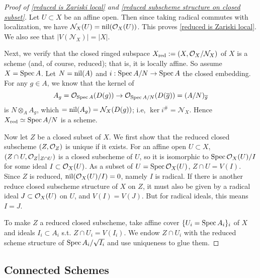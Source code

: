 \begin{proof}[Proof of \cref{reduced is Zariski local} and \cref{reduced subscheme structure on closed subset}]
    Let $U\subset X$ be an affine open.
    Then since taking radical commutes with localization,
    we have $\mathcal{N}_X(U) = \operatorname{nil}(\mathcal{O}_X(U))$.
    This proves \cref{reduced is Zariski local}.
    We also see that $|V(\mathcal{N}_X)| = |X|$.

    Next, we verify that the closed ringed subspace $X_{\operatorname{red}} := (X, \mathcal{O}_X/\mathcal{N}_X)$
    of $X$ is a scheme (and, of course, reduced); that is, it is locally affine. So assume $X = \operatorname{Spec} A$.
    Let $N = \operatorname{nil}(A)$ and $i : \operatorname{Spec} A/N\to \operatorname{Spec} A$ the closed embedding.
    For any $g\in A$,
    we know that the kernel of
    \[A_g = \mathcal{O}_{\operatorname{Spec} A}(D(g))\to \mathcal{O}_{\operatorname{Spec} A/N}(D(\overline g)) = (A/N)_{\overline g}\]
    is $N\otimes_A A_g$,
    which $ = \operatorname{nil}(A_g) = \mathcal{N}_X(D(g))$;
    i.e, $\ker i^\# = \mathcal{N}_X$.
    Hence $X_{\operatorname{red}} \simeq \operatorname{Spec} A/N$ is a scheme.

    Now let $Z$ be a closed subset of $X$.
    We first show that the reduced closed subscheme $(Z, \mathcal{O}_Z)$ is unique if it exists.
    For an affine open $U\subset X$,
    $(Z\cap U, \mathcal{O}_Z|_{Z\cap U})$ is a closed subscheme of $U$,
    so it is isomorphic to $\operatorname{Spec} \mathcal{O}_X(U)/I$
    for some ideal $I\subset \mathcal{O}_X(U)$.
    As a subset of $U = \operatorname{Spec} \mathcal{O}_X(U)$,
    $Z\cap U = V(I)$.
    Since $Z$ is reduced, $\operatorname{nil}(\mathcal{O}_X(U)/I) = 0$,
    namely $I$ is radical.
    If there is another reduce closed subscheme structure of $X$ on $Z$,
    it must also be given by a radical ideal $J\subset\mathcal{O}_X(U)$ on $U$,
    and $V(I) = V(J)$. But for radical ideals, this means $I = J$.

    To make $Z$ a reduced closed subscheme,
    take affine cover $\{U_i = \operatorname{Spec} A_i\}_i$ of $X$
    and ideals $I_i\subset A_i$ s.t. $Z\cap U_i = V(I_i)$.
    We endow $Z\cap U_i$ with the reduced scheme structure of $\operatorname{Spec} A_i/\sqrt{I_i}$ and use uniqueness to glue them.
\end{proof}

\subsection{Connected Schemes}

